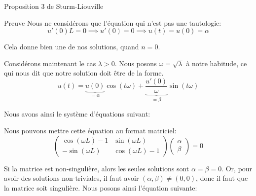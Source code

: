 \documentclass[a4paper]{article}
\begin{document}
\begin{parag}{Proposition 3 de Sturm-Liouville}
\begin{subparag}{Preuve}
        Nous ne considérons que l'équation qui n'est pas une tautologie:
         \[u'\left(0\right)L = 0 \implies u'\left(0\right) = 0 \implies u\left(t\right) = u\left(0\right) = \alpha\]
        
        Cela donne bien une de nos solutions, quand $n = 0$.

        Considérons maintenant le cas $\lambda > 0$. Nous posons $\omega = \sqrt{\lambda}$ à notre habitude, ce qui nous dit que notre solution doit être de la forme. 
        \[u\left(t\right) = \underbrace{u\left(0\right)}_{= \alpha}\cos\left(t \omega\right) + \underbrace{\frac{u'\left(0\right)}{\omega}}_{= \beta} \sin\left(t \omega\right)\]
        
        Nous avons ainsi le système d'équations suivant: 
        
        Nous pouvons mettre cette équation au format matriciel: 
        \[\begin{pmatrix} \cos\left(\omega L\right) - 1 & \sin\left(\omega L\right) \\ -\sin\left(\omega L\right) & \cos\left(\omega L\right) - 1 \end{pmatrix} \begin{pmatrix} \alpha \\ \beta \end{pmatrix} = 0\]

        Si la matrice est non-singulière, alors les seules solutions sont $\alpha = \beta = 0$. Or, pour avoir des solutions non-triviales, il faut avoir $\left(\alpha, \beta\right) \neq \left(0, 0\right)$, donc il faut que la matrice soit singulière. Nous posons ainsi l'équation suivante: 
        

\end{subparag}
\end{parag}
\end{document}
